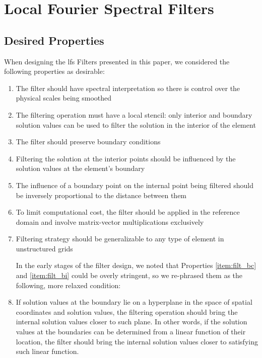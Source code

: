 \section{Local Fourier Spectral Filters}
\label{sec:lfsfilter}

\subsection{Desired Properties}
\label{sec:lfs_properties}
When designing the \gls{lfs} Filters presented in this paper, we considered the following properties as desirable:
\begin{enumerate}[1. ]
\item The filter should have spectral interpretation so there is control over the physical scales being smoothed
\item \label{item:local_stencil} The filtering operation must have a local stencil: only interior and boundary solution values can be used to filter the solution in the interior of the element
\item \label{item:filt_bc}The filter should preserve boundary conditions
\item \label{item:filt_bi}Filtering the solution at the interior points should be influenced by the solution values at the element's boundary
\item \label{item:influence}The influence of a boundary point on the internal point being filtered should be inversely proportional to the distance between them
\item To limit computational cost, the filter should be applied in the reference domain and involve matrix-vector multiplications exclusively

\item \label{item:generalizability}Filtering strategy should be generalizable to any type of element in unstructured grids

In the early stages of the filter design, we noted that Properties \ref{item:filt_bc} and \ref{item:filt_bi} could be overly stringent, so we re-phrased them as the following, more relaxed condition:

\item \label{item:coplanar}If solution values at the boundary lie on a hyperplane in the space of spatial coordinates and solution values, the filtering operation should bring the internal solution values closer to such plane. In other words, if the solution values at the boundaries can be determined from a linear function of their location, the filter should bring the internal solution values closer to satisfying such linear function.
\end{enumerate}



